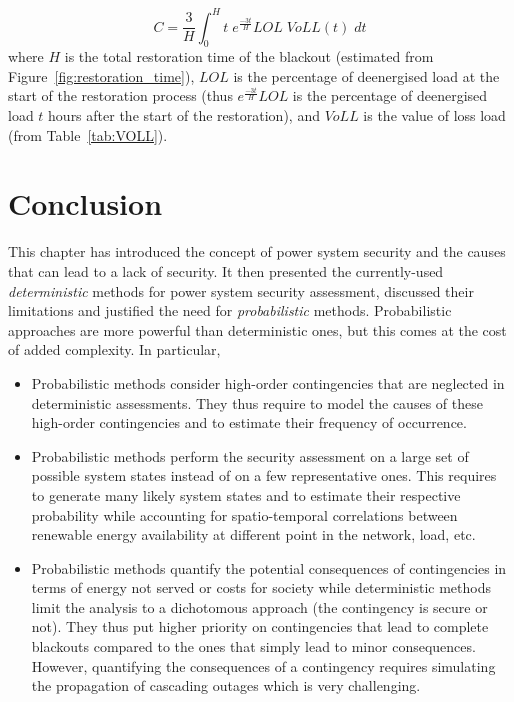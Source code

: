 \begin{equation}
    \label{eq:VOLL}
    C = \frac{3}{H} \int_0^H t \; e^{\frac{-3t}{H}} LOL \; VoLL(t) \; dt
\end{equation}
\noindent where \(H\) is the total restoration time of the blackout (estimated from Figure~\ref{fig:restoration_time}), \(LOL\) is the percentage of deenergised load at the start of the restoration process (thus \(e^{\frac{-3t}{H}} LOL\) is the percentage of deenergised load \(t\) hours after the start of the restoration), and \(VoLL\) is the value of loss load (from Table~\ref{tab:VOLL}).


\section{Conclusion}
\label{sec:security-conclusions}

This chapter has introduced the concept of power system security and the causes that can lead to a lack of security. It then presented the currently-used \emph{deterministic} methods for power system security assessment, discussed their limitations and justified the need for \emph{probabilistic} methods. Probabilistic approaches are more powerful than deterministic ones, but this comes at the cost of added complexity. In particular,

\begin{itemize}
    \item Probabilistic methods consider high-order contingencies that are neglected in deterministic assessments. They thus require to model the causes of these high-order contingencies and to estimate their frequency of occurrence.
    \item Probabilistic methods perform the security assessment on a large set of possible system states instead of on a few representative ones. This requires to generate many likely system states and to estimate their respective probability while accounting for spatio-temporal correlations between renewable energy availability at different point in the network, load, etc.
    \item Probabilistic methods quantify the potential consequences of contingencies in terms of energy not served or costs for society while deterministic methods limit the analysis to a dichotomous approach (the contingency is secure or not). They thus put higher priority on contingencies that lead to complete blackouts compared to the ones that simply lead to minor consequences. However, quantifying the consequences of a contingency requires simulating the propagation of cascading outages which is very challenging.
\end{itemize}

